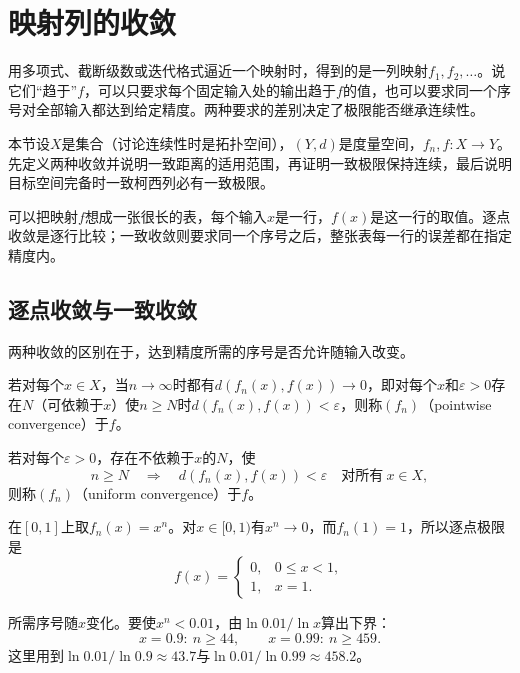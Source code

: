 \section{映射列的收敛}
\label{sec:mmap-map-sequences}

用多项式、截断级数或迭代格式逼近一个映射时，得到的是一列映射$f_1,f_2,\ldots$。说它们“趋于”$f$，可以只要求每个固定输入处的输出趋于$f$的值，也可以要求同一个序号对全部输入都达到给定精度。两种要求的差别决定了极限能否继承连续性。

本节设$X$是集合（讨论连续性时是拓扑空间），$(Y,d)$是度量空间，$f_n,f:X\to Y$。先定义两种收敛并说明一致距离的适用范围，再证明一致极限保持连续，最后说明目标空间完备时一致柯西列必有一致极限。

可以把映射$f$想成一张很长的表，每个输入$x$是一行，$f(x)$是这一行的取值。逐点收敛是逐行比较；一致收敛则要求同一个序号之后，整张表每一行的误差都在指定精度内。

\subsection{逐点收敛与一致收敛}
\label{sec:mmap-pointwise-uniform}

两种收敛的区别在于，达到精度所需的序号是否允许随输入改变。

\begin{definition}[逐点收敛与一致收敛]
\label{def:mmap-pointwise-uniform}
若对每个$x\in X$，当$n\to\infty$时都有$d(f_n(x),f(x))\to0$，即对每个$x$和$\varepsilon>0$存在$N$（可依赖于$x$）使$n\geq N$时$d(f_n(x),f(x))<\varepsilon$，则称$(f_n)$（pointwise convergence）于$f$。

若对每个$\varepsilon>0$，存在不依赖于$x$的$N$，使
\begin{equation}
 n\geq N
 \quad\Longrightarrow\quad
 d(f_n(x),f(x))<\varepsilon\quad\text{对所有}\ x\in X,
 \label{eq:mmap-uniform-convergence}
\end{equation}
则称$(f_n)$（uniform convergence）于$f$。
\end{definition}

在$[0,1]$上取$f_n(x)=x^n$。对$x\in[0,1)$有$x^n\to0$，而$f_n(1)=1$，所以逐点极限是
\[
 f(x)=\begin{cases}0,&0\leq x<1,\\1,&x=1.\end{cases}
\]

所需序号随$x$变化。要使$x^n<0.01$，由$\ln0.01/\ln x$算出下界：
\[
 x=0.9:\ n\geq44,\qquad x=0.99:\ n\geq459.
\]
这里用到$\ln0.01/\ln0.9\approx43.7$与$\ln0.01/\ln0.99\approx458.2$。

